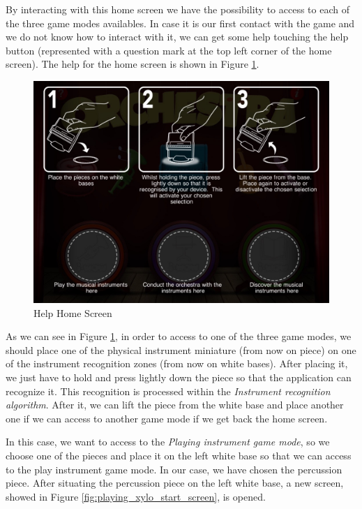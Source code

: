 \newpage

By interacting with this home screen we have the possibility to access to each of the three game modes availables. In case it is our first contact with the game and we do not know how to interact with it, we can get some help touching the help button (represented with a question mark at the top left corner of the home screen). The help for the home screen is shown in Figure \ref{fig:help_home_screen}.

\begin{figure}[ht!]
	\centering
	\includegraphics[width=400pt]{graphics/use-case/help_home_screen.jpg}
	\caption{Help Home Screen}
	\label{fig:help_home_screen}
\end{figure}

As we can see in Figure \ref{fig:help_home_screen}, in order to access to one of the three game modes, we should place one of the physical instrument miniature (from now on piece) on one of the instrument recognition zones (from now on white bases). After placing it, we just have to hold and press lightly down the piece so that the application can recognize it. This recognition is processed within the \textit{Instrument recognition algorithm}. After it, we can lift the piece from the white base and place another one if we can access to another game mode if we get back the home screen.

In this case, we want to access to the \textit{Playing instrument game mode}, so we choose one of the pieces and place it on the left white base so that we can access to the play instrument game mode. In our case, we have chosen the percussion piece. After situating the percussion piece on the left white base, a new screen, showed in Figure \ref{fig:playing_xylo_start_screen}, is opened.

